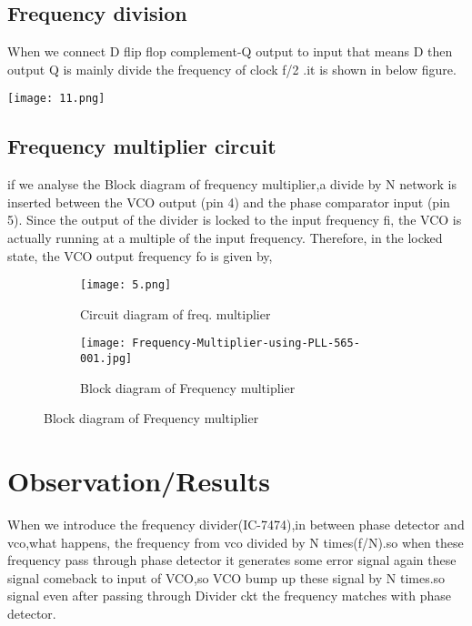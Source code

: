 \documentclass{article}
\begin{document}
\subsection{Frequency division }
When we connect D flip flop complement-Q output to input that means D then output Q is mainly divide the frequency of clock f/2 .it is shown in below figure.
\begin{figure*}[ht]
	\centering
	\texttt{[image: 11.png]}
	\caption{Frequency division circuit}
	\label{FBD}
\end{figure*}





\subsection{Frequency multiplier circuit}
if we analyse the Block diagram of frequency multiplier,a divide by N network is inserted between the VCO output (pin 4) and the phase comparator input (pin 5). Since the output of the divider is locked to the input frequency fi, the VCO is actually running at a multiple of the input frequency. Therefore, in the locked state, the VCO output frequency fo is given by,



\begin{figure}[h]
  \begin{subfigure}[b]{0.5\textwidth}
    \texttt{[image: 5.png]}
    \caption{ Circuit diagram of freq. multiplier}
    \label{fig:1}
  \end{subfigure}
  \begin{subfigure}[b]{0.5\textwidth}
    \texttt{[image: Frequency-Multiplier-using-PLL-565-001.jpg]}
    \caption{Block diagram of Frequency multiplier}
    \label{fig:2}
  \end{subfigure}
\end{figure}

















\section{Observation/Results}
When we introduce the frequency divider(IC-7474),in between phase detector and vco,what happens, the frequency from vco divided by N times(f/N).so when these frequency  pass through phase detector it generates some error signal again these signal comeback to  input of VCO,so VCO bump up these signal by N times.so signal even after passing through Divider ckt the frequency matches with phase detector.\par
\end{document}
